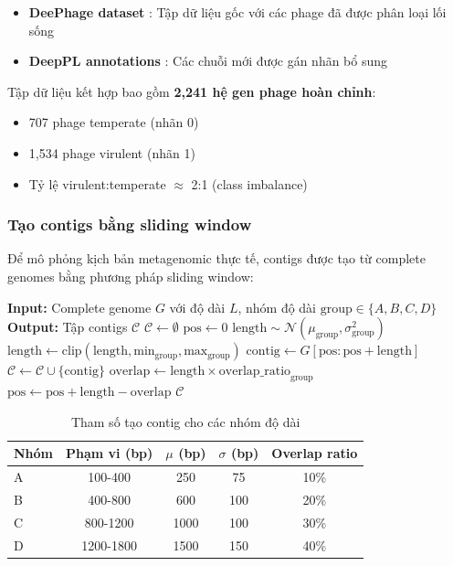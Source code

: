 \begin{itemize}
    \item \textbf{DeePhage dataset} \cite{wu2021deephage}: Tập dữ liệu gốc với các phage đã được phân loại lối sống
    \item \textbf{DeepPL annotations} \cite{zhang2024deeppl}: Các chuỗi mới được gán nhãn bổ sung
\end{itemize}

Tập dữ liệu kết hợp bao gồm \textbf{2,241 hệ gen phage hoàn chỉnh}:
\begin{itemize}
    \item 707 phage temperate (nhãn 0)
    \item 1,534 phage virulent (nhãn 1)
    \item Tỷ lệ virulent:temperate $\approx$ 2:1 (class imbalance)
\end{itemize}

\subsubsection{Tạo contigs bằng sliding window}

Để mô phỏng kịch bản metagenomic thực tế, contigs được tạo từ complete genomes bằng phương pháp sliding window:

\begin{algorithm}[h]
\caption{Contig Generation với Sliding Window}
\label{alg:contig_generation}
\begin{algorithmic}[1]
\State \textbf{Input:} Complete genome $G$ với độ dài $L$, nhóm độ dài $\text{group} \in \{A, B, C, D\}$
\State \textbf{Output:} Tập contigs $\mathcal{C}$
\State $\mathcal{C} \leftarrow \emptyset$
\State $\text{pos} \leftarrow 0$
    \State $\text{length} \sim \mathcal{N}(\mu_{\text{group}}, \sigma_{\text{group}}^2)$ 
    \State $\text{length} \leftarrow \text{clip}(\text{length}, \text{min}_{\text{group}}, \text{max}_{\text{group}})$
    \State $\text{contig} \leftarrow G[\text{pos}:\text{pos}+\text{length}]$
    \State $\mathcal{C} \leftarrow \mathcal{C} \cup \{\text{contig}\}$
    \State $\text{overlap} \leftarrow \text{length} \times \text{overlap\_ratio}_{\text{group}}$
    \State $\text{pos} \leftarrow \text{pos} + \text{length} - \text{overlap}$
\EndWhile
\State \Return $\mathcal{C}$
\end{algorithmic}
\end{algorithm}

\begin{table}[h]
\centering
\caption{Tham số tạo contig cho các nhóm độ dài}
\label{tab:contig_params}
\begin{tabular}{lcccc}
\toprule
\textbf{Nhóm} & \textbf{Phạm vi (bp)} & \textbf{$\mu$ (bp)} & \textbf{$\sigma$ (bp)} & \textbf{Overlap ratio} \\
\midrule
A & 100-400 & 250 & 75 & 10\% \\
B & 400-800 & 600 & 100 & 20\% \\
C & 800-1200 & 1000 & 100 & 30\% \\
D & 1200-1800 & 1500 & 150 & 40\% \\
\bottomrule
\end{tabular}
\end{table}

